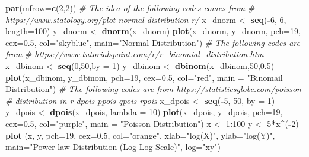 \documentclass[
]{krantz}
\makeatletter
\newenvironment{Shaded}{\begin{snugshade}}{\end{snugshade}}
\newcommand{\CommentTok}[1]{\textcolor[rgb]{0.37,0.37,0.37}{\textit{#1}}}
\newcommand{\DataTypeTok}[1]{\textcolor[rgb]{0.27,0.27,0.27}{#1}}
\newcommand{\DecValTok}[1]{\textcolor[rgb]{0.06,0.06,0.06}{#1}}
\newcommand{\FloatTok}[1]{\textcolor[rgb]{0.06,0.06,0.06}{#1}}
\newcommand{\KeywordTok}[1]{\textcolor[rgb]{0.27,0.27,0.27}{\textbf{#1}}}
\newcommand{\NormalTok}[1]{#1}
\newcommand{\OperatorTok}[1]{\textcolor[rgb]{0.43,0.43,0.43}{\textbf{#1}}}
\newcommand{\StringTok}[1]{\textcolor[rgb]{0.5,0.5,0.5}{#1}}
\newenvironment{kframe}{%
\medskip{}
\setlength{\fboxsep}{.8em}
 \def\at@end@of@kframe{}%
 \ifinner\ifhmode%
  \def\at@end@of@kframe{\end{minipage}}%
  \begin{minipage}{\columnwidth}%
 \fi\fi%
 \def\FrameCommand##1{\hskip\@totalleftmargin \hskip-\fboxsep
 \colorbox{shadecolor}{##1}\hskip-\fboxsep
     \hskip-\linewidth \hskip-\@totalleftmargin \hskip\columnwidth}%
 \MakeFramed {\advance\hsize-\width
   \@totalleftmargin\z@ \linewidth\hsize
   \@setminipage}}%
 {\par\unskip\endMakeFramed%
 \at@end@of@kframe}
\renewenvironment{Shaded}{\begin{kframe}}{\end{kframe}}
\makeatother
\begin{document}
\begin{Shaded}
\begin{Highlighting}[]
\KeywordTok{par}\NormalTok{(}\DataTypeTok{mfrow=}\KeywordTok{c}\NormalTok{(}\DecValTok{2}\NormalTok{,}\DecValTok{2}\NormalTok{))}
\CommentTok{# The idea of the following codes comes from}
\CommentTok{# https://www.statology.org/plot-normal-distribution-r/}
\NormalTok{x_dnorm <-}\StringTok{ }\KeywordTok{seq}\NormalTok{(}\OperatorTok{-}\DecValTok{6}\NormalTok{, }\DecValTok{6}\NormalTok{, }\DataTypeTok{length=}\DecValTok{100}\NormalTok{)}
\NormalTok{y_dnorm <-}\StringTok{ }\KeywordTok{dnorm}\NormalTok{(x_dnorm)}
\KeywordTok{plot}\NormalTok{(x_dnorm, y_dnorm, }\DataTypeTok{pch=}\DecValTok{19}\NormalTok{, }\DataTypeTok{cex=}\FloatTok{0.5}\NormalTok{, }\DataTypeTok{col=}\StringTok{"skyblue"}\NormalTok{,}
     \DataTypeTok{main=}\StringTok{"Normal Distribution"}\NormalTok{)}
\CommentTok{# The following codes are from }
\CommentTok{# https://www.tutorialspoint.com/r/r_binomial_distribution.htm}
\NormalTok{x_dbinom <-}\StringTok{ }\KeywordTok{seq}\NormalTok{(}\DecValTok{0}\NormalTok{,}\DecValTok{50}\NormalTok{,}\DataTypeTok{by =} \DecValTok{1}\NormalTok{)}
\NormalTok{y_dbinom <-}\StringTok{ }\KeywordTok{dbinom}\NormalTok{(x_dbinom,}\DecValTok{50}\NormalTok{,}\FloatTok{0.5}\NormalTok{)}
\KeywordTok{plot}\NormalTok{(x_dbinom, y_dbinom, }\DataTypeTok{pch=}\DecValTok{19}\NormalTok{, }\DataTypeTok{cex=}\FloatTok{0.5}\NormalTok{, }\DataTypeTok{col=}\StringTok{"red"}\NormalTok{,}
     \DataTypeTok{main =} \StringTok{"Binomail Distribution"}\NormalTok{)}
\CommentTok{# The following codes are from https://statisticsglobe.com/poisson-}
\CommentTok{# distribution-in-r-dpois-ppois-qpois-rpois}
\NormalTok{x_dpois <-}\StringTok{ }\KeywordTok{seq}\NormalTok{(}\OperatorTok{-}\DecValTok{5}\NormalTok{, }\DecValTok{50}\NormalTok{, }\DataTypeTok{by =} \DecValTok{1}\NormalTok{)}
\NormalTok{y_dpois <-}\StringTok{ }\KeywordTok{dpois}\NormalTok{(x_dpois, }\DataTypeTok{lambda =} \DecValTok{10}\NormalTok{)}
\KeywordTok{plot}\NormalTok{(x_dpois, y_dpois, }\DataTypeTok{pch=}\DecValTok{19}\NormalTok{, }\DataTypeTok{cex=}\FloatTok{0.5}\NormalTok{, }\DataTypeTok{col=}\StringTok{"purple"}\NormalTok{,}
     \DataTypeTok{main =} \StringTok{"Poisson Distribution"}\NormalTok{)}
\NormalTok{x <-}\StringTok{ }\DecValTok{1}\OperatorTok{:}\DecValTok{100}
\NormalTok{y <-}\StringTok{ }\DecValTok{5}\OperatorTok{*}\NormalTok{x}\OperatorTok{^}\NormalTok{(}\OperatorTok{-}\DecValTok{2}\NormalTok{)}
\KeywordTok{plot}\NormalTok{ (x, y, }\DataTypeTok{pch=}\DecValTok{19}\NormalTok{, }\DataTypeTok{cex=}\FloatTok{0.5}\NormalTok{, }\DataTypeTok{col=}\StringTok{"orange"}\NormalTok{,}
      \DataTypeTok{xlab=}\StringTok{"log(X)"}\NormalTok{, }\DataTypeTok{ylab=}\StringTok{"log(Y)"}\NormalTok{,}
      \DataTypeTok{main=}\StringTok{"Power-law Distribution (Log-Log Scale)"}\NormalTok{,}
      \DataTypeTok{log=}\StringTok{"xy"}\NormalTok{)}
\end{Highlighting}
\end{Shaded}
\end{document}
